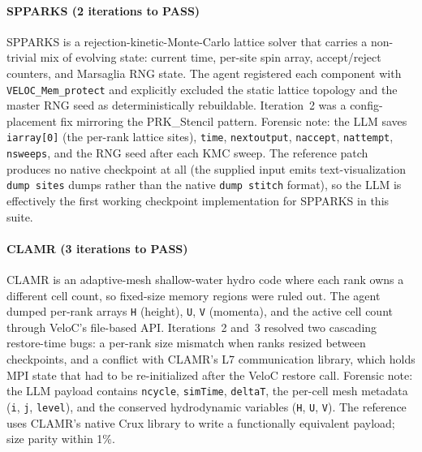 \documentclass[conference]{IEEEtran}
\begin{document}
\paragraph{SPPARKS (2 iterations to PASS)}
SPPARKS is a rejection-kinetic-Monte-Carlo lattice solver that carries a non-trivial mix of evolving state: current time, per-site spin array, accept/reject counters, and Marsaglia RNG state. The agent registered each component with \texttt{VELOC\_Mem\_protect} and explicitly excluded the static lattice topology and the master RNG seed as deterministically rebuildable. Iteration~2 was a config-placement fix mirroring the PRK\_Stencil pattern. Forensic note: the LLM saves \texttt{iarray[0]} (the per-rank lattice sites), \texttt{time}, \texttt{nextoutput}, \texttt{naccept}, \texttt{nattempt}, \texttt{nsweeps}, and the RNG seed after each KMC sweep. The reference patch produces no native checkpoint at all (the supplied input emits text-visualization \texttt{dump sites} dumps rather than the native \texttt{dump stitch} format), so the LLM is effectively the first working checkpoint implementation for SPPARKS in this suite.

\paragraph{CLAMR (3 iterations to PASS)}
CLAMR is an adaptive-mesh shallow-water hydro code where each rank owns a different cell count, so fixed-size memory regions were ruled out. The agent dumped per-rank arrays \texttt{H} (height), \texttt{U}, \texttt{V} (momenta), and the active cell count through VeloC's file-based API. Iterations~2 and~3 resolved two cascading restore-time bugs: a per-rank size mismatch when ranks resized between checkpoints, and a conflict with CLAMR's L7 communication library, which holds MPI state that had to be re-initialized after the VeloC restore call. Forensic note: the LLM payload contains \texttt{ncycle}, \texttt{simTime}, \texttt{deltaT}, the per-cell mesh metadata (\texttt{i}, \texttt{j}, \texttt{level}), and the conserved hydrodynamic variables (\texttt{H}, \texttt{U}, \texttt{V}). The reference uses CLAMR's native Crux library to write a functionally equivalent payload; size parity within 1\%.
\end{document}

